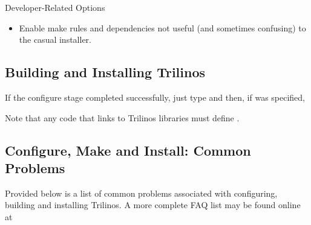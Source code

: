 Developer-Related Options
\begin{itemize}
\item {}

Enable make rules and dependencies not useful (and sometimes confusing) to 
the casual installer.
\end{itemize}

\subsection{Building and Installing Trilinos}

If the configure stage completed successfully, just type 
 and then, if 
 was specified, 

\begin{minipage}[c]{\textwidth}

\begin{minipage}[l]{.6\textwidth}

Note that any code that links to Trilinos libraries must define
.
\end{minipage}\hfill
{}
\end{minipage}

\subsection{Configure, Make and Install: Common Problems}

\begin{minipage}[c]{\textwidth}
                                                                                
\begin{minipage}[l]{.6\textwidth}
Provided below is a list of common problems associated with configuring,
building and installing Trilinos.  A more complete FAQ list may be found online at
\end{minipage}\hfill
{}
\end{minipage}

